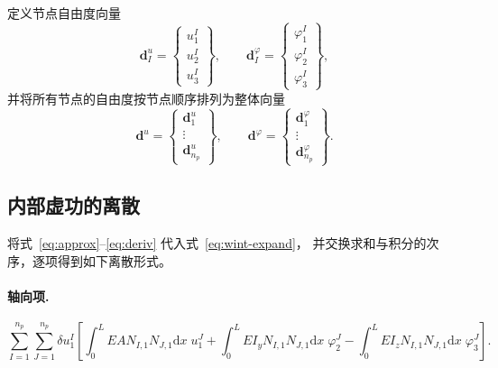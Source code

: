 \documentclass[UTF8,a4paper,11pt]{ctexart}
\newcommand{\ud}{\mathrm{d}}
\newcommand{\bd}{\mathbf{d}}
\begin{document}
定义节点自由度向量
\begin{equation}\label{eq:nodedof}
\bd_I^u=\begin{Bmatrix}u_1^I\\u_2^I\\u_3^I\end{Bmatrix},\qquad
\bd_I^\varphi=\begin{Bmatrix}\varphi_1^I\\\varphi_2^I\\\varphi_3^I\end{Bmatrix},
\end{equation}
并将所有节点的自由度按节点顺序排列为整体向量
\begin{equation}
\bd^u=\begin{Bmatrix}\bd_1^u\\\vdots\\\bd_{n_p}^u\end{Bmatrix},\qquad
\bd^\varphi=\begin{Bmatrix}\bd_1^\varphi\\\vdots\\\bd_{n_p}^\varphi\end{Bmatrix}.
\end{equation}

\subsection{内部虚功的离散}

将式~\eqref{eq:approx}--\eqref{eq:deriv} 代入式~\eqref{eq:wint-expand}，
并交换求和与积分的次序，逐项得到如下离散形式。

\paragraph{轴向项.}
\begin{equation}\label{eq:axial}
\sum_{I=1}^{n_p}\sum_{J=1}^{n_p}\delta u_1^I\left[
\int_0^L EAN_{I,1}N_{J,1}\ud x\;u_1^J
+\int_0^L EI_yN_{I,1}N_{J,1}\ud x\;\varphi_2^J
-\int_0^L EI_zN_{I,1}N_{J,1}\ud x\;\varphi_3^J
\right].
\end{equation}
\end{document}
